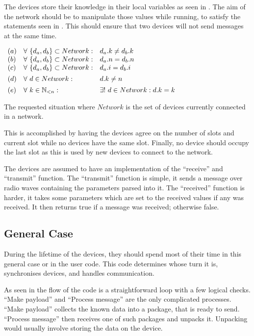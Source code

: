 The devices store their knowledge in their local variables as seen in . 
The aim of the network should be to manipulate those values while running, to satisfy the statements seen in . 
This should ensure that two devices will not send messages at the same time.

\begin{table}[H]
	\centering
	$\begin{array}{l l l}
		(a)&\forall\ \{d_a, d_b\} \subset Network: & d_a.k \neq d_b.k \\
		(b)&\forall\ \{d_a, d_b\} \subset Network: & d_a.n = d_b.n \\
		(c)&\forall\ \{d_a, d_b\} \subset Network: & d_a.i = d_b.i \\[1ex]
		(d)&\forall\ d \in Network: & d.k \neq n \\[1ex]
		(e)&\forall\ k \in \mathbb{N}_{<n}: & \exists!\ d \in Network: d.k = k 
	\end{array}$
	\caption{The requested situation where $Network$ is the set of devices currently connected in a network.}
    \label{tab:invariants}
\end{table}

This is accomplished by having the devices agree on the number of slots and current slot while no devices have the same slot. 
Finally, no device should occupy the last slot as this is used by new devices to connect to the network.

The devices are assumed to have an implementation of the \enquote{receive} and \enquote{transmit} function.
The \enquote{transmit} function is simple, it sends a message over radio waves containing the parameters parsed into it.
The \enquote{received} function is harder, it takes some parameters which are set to the received values if any was received. 
It then returns true if a message was received; otherwise false.
                    
\subsection{General Case} %
\label{sub:general_case}

During the lifetime of the devices, they should spend most of their time in this general case or in the user code. 
This code determines whose turn it is, synchronises devices, and handles communication.

As seen in  the flow of the code is a straightforward loop with a few logical checks. 
\enquote{Make payload} and \enquote{Process message} are the only complicated processes. 
\enquote{Make payload} collects the known data into a package, that is ready to send. 
\enquote{Process message} then receives one of such packages and unpacks it. 
Unpacking would usually involve storing the data on the device.

